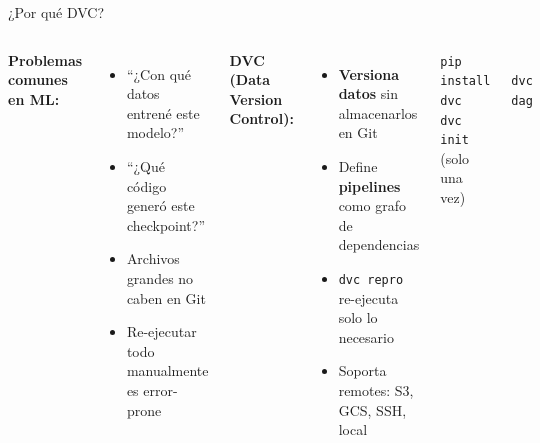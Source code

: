 \documentclass[aspectratio=169,10pt]{beamer}
\begin{document}
\begin{frame}{¿Por qué DVC?}
    \begin{columns}
        \textbf{Problemas comunes en ML:}
        \begin{itemize}
            \item ``¿Con qué datos entrené este modelo?''
            \item ``¿Qué código generó este checkpoint?''
            \item Archivos grandes no caben en Git
            \item Re-ejecutar todo manualmente es error-prone
        \end{itemize}

        \vspace{8pt}
        \textbf{DVC (Data Version Control):}
        \begin{itemize}
            \item \textbf{Versiona datos} sin almacenarlos en Git
            \item Define \textbf{pipelines} como grafo de dependencias
            \item \texttt{dvc repro} re-ejecuta solo lo necesario
            \item Soporta remotes: S3, GCS, SSH, local
        \end{itemize}

        \begin{tcolorbox}[colback=lightgray, colframe=pyblue!60, title=\scriptsize Instalación]
            \scriptsize
            \texttt{pip install dvc}\\
            \texttt{dvc init} {\tiny (solo una vez)}
        \end{tcolorbox}

        \vspace{6pt}
        \begin{tcolorbox}[colback=lightgray, colframe=darkgreen!70, title=\scriptsize Pipeline DAG]
            \scriptsize\centering
            \\[4pt]
            \texttt{dvc dag}
        \end{tcolorbox}
    \end{columns}
\end{frame}
\end{document}
